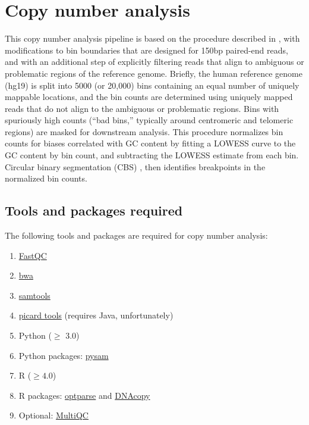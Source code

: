 \documentclass[11pt]{article}
\begin{document}
\section{Copy number analysis}
This copy number analysis pipeline is based on the procedure described in
\citep{baslan2012genome,kendall2014computational}, with modifications to
bin boundaries that are designed for 150bp paired-end reads, and with
an additional step of explicitly filtering reads that align to ambiguous
or problematic regions of the reference genome. Briefly, the human
reference genome (hg19) is split into 5000 (or 20,000) bins containing
an equal number of uniquely mappable locations, and the bin counts are
determined using uniquely mapped reads that do not align to the
ambiguous or problematic regions. Bins with spuriously high counts
(``bad bins,'' typically around centromeric and telomeric regions) are
masked for downstream analysis. This procedure normalizes bin counts for
biases correlated with GC content by fitting a LOWESS curve to the GC
content by bin count, and subtracting the LOWESS estimate from each bin.
Circular binary segmentation (CBS) \citep{olshen2004circular}, then
identifies breakpoints in the normalized bin counts.


\subsection{Tools and packages required}
The following tools and packages are required for copy number analysis:
\begin{enumerate}
\setlength{\itemsep}{0pt}
  \item \href{https://www.bioinformatics.babraham.ac.uk/projects/fastqc/}
    {FastQC}
  \item \href{https://github.com/lh3/bwa}{bwa}
  \item \href{http://www.htslib.org/}{samtools}
  \item \href{https://broadinstitute.github.io/picard/}{picard tools}
    (requires Java, unfortunately)
  \item Python ($\geq$ 3.0)
  \item Python packages:
    \href{https://pysam.readthedocs.io/en/latest/}{pysam}
  \item R ($\geq 4.0$)
  \item R packages:
    \href{https://cran.r-project.org/web/packages/optparse/index.html}{optparse}
    and \href{https://bioconductor.org/packages/release/bioc/html/DNAcopy.html}
    {DNAcopy}
  \item Optional: \href{https://multiqc.info/}{MultiQC}
\end{enumerate}
\end{document}
